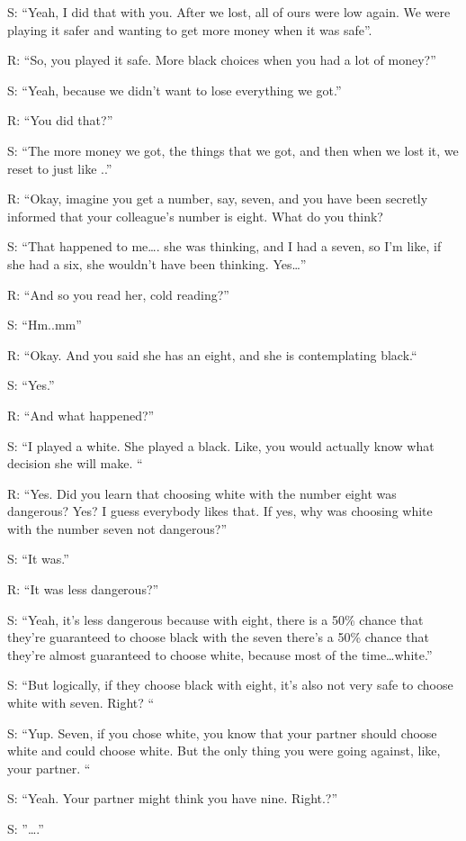 \documentclass[a4paper,superscriptaddress,nofootinbib]{revtex4}
\begin{document}
S: “Yeah, I did that with you. After we lost, all of ours were low again. We were playing it safer and wanting to get more money when it was safe”.

R: “So, you played it safe. More black choices when you had a lot of money?”

S: “Yeah, because we didn't want to lose everything we got.”
 
R: “You did that?”

S: “The more money we got, the things that we got, and then when we lost it, we reset to just like ..”

R: “Okay, imagine you get a number, say, seven, and you have been secretly informed that your colleague's number is eight. What do you think?

S: “That happened to me…. she was thinking, and I had a seven, so I'm like, if she had a six, she wouldn't have been thinking. Yes…” 

R: “And so you read her, cold reading?”

S: “Hm..mm”


R: “Okay. And you said she has an eight, and she is contemplating black.“

S: “Yes.”

R: “And what happened?”

S: “I played a white. She played a black. Like, you would actually know what decision she will make. “

R: “Yes. Did you learn that choosing white with the number eight was dangerous? Yes? I guess everybody likes that. If yes, why was choosing white with the number seven not dangerous?”

S: “It was.”

R: “It was less dangerous?”

S: “Yeah, it's less dangerous because with eight, there is a 50\% chance that they're guaranteed to choose black with the seven there's a 50\% chance that they're almost guaranteed to choose white, because most of the time…white.”

S: “But logically, if they choose black with eight, it's also not very safe to choose white with seven. Right? “

S: “Yup. Seven, if you chose white, you know that your partner should choose white and could choose white. But the only thing you were going against, like, your partner. “

S: “Yeah. Your partner might think you have nine. Right.?”

S: ”….”
\end{document}
